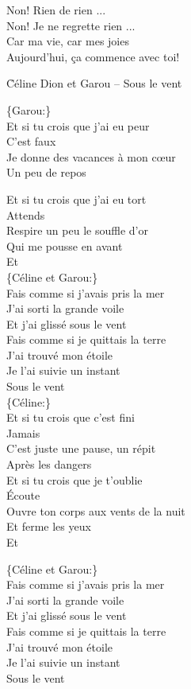 \documentclass{novel}
\begin{document}
Non! Rien de rien ... \\
Non! Je ne regrette rien ... \\
Car ma vie, car mes joies \\
Aujourd'hui, ça commence avec toi!

\newpage
\normalsize
\h*{Céline Dion et Garou – Sous le vent}

\begin{multicols}{2}
\{Garou:\} \\
Et si tu crois que j'ai eu peur \\
C'est faux \\
Je donne des vacances à mon cœur \\
Un peu de repos

Et si tu crois que j'ai eu tort \\
Attends \\
Respire un peu le souffle d'or \\
Qui me pousse en avant \\
Et \\

\{Céline et Garou:\} \\
Fais comme si j'avais pris la mer \\
J'ai sorti la grande voile \\
Et j'ai glissé sous le vent \\
Fais comme si je quittais la terre \\
J'ai trouvé mon étoile \\
Je l'ai suivie un instant \\
Sous le vent \\

\{Céline:\} \\
Et si tu crois que c'est fini \\
Jamais \\
C'est juste une pause, un répit \\
Après les dangers \\

Et si tu crois que je t'oublie \\
Écoute \\
Ouvre ton corps aux vents de la nuit \\
Et ferme les yeux \\
Et \\
\columnbreak

\{Céline et Garou:\} \\
Fais comme si j'avais pris la mer \\
J'ai sorti la grande voile \\
Et j'ai glissé sous le vent \\
Fais comme si je quittais la terre \\
J'ai trouvé mon étoile \\
Je l'ai suivie un instant \\
Sous le vent \\


\end{multicols}
\end{document}
